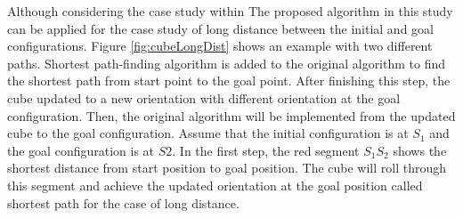 
\clearpage
\newpage
\noindent Although considering the case study within 
The proposed algorithm in this study can be applied for the case study of long distance between the initial and goal configurations. 
Figure \ref{fig:cubeLongDist} shows an example with two different paths.
Shortest path-finding algorithm is added to the original algorithm to find the shortest path from start point to the goal point. 
After finishing this step, the cube updated to a new orientation with different orientation at the goal configuration. Then, the original algorithm will be implemented from the updated cube to the goal configuration.
Assume that the initial configuration is at $S_1$ and the goal configuration is at $S2$. In the first step, the red segment $S_1S_2$ shows the shortest distance from start position to goal position. The cube will roll through this segment and achieve the updated orientation at the goal position called shortest path for the case of long distance. 

